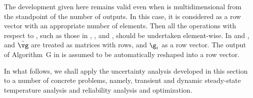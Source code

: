 \begin{remark} 
The development given here remains valid even when \g is multidimensional from
the standpoint of the number of outputs. In this case, it is considered as a row
vector with an appropriate number of elements. Then all the operations with
respect to \g, such as those in ,
, and , should be undertaken
element-wise. In  and , \vg and
$\hat{\vg}$ are treated as matrices with \nc rows, and $\g_i$ as a row vector.
The output of Algorithm~G in  is assumed to be
automatically reshaped into a row vector.
\end{remark}

In what follows, we shall apply the uncertainty analysis developed in this
section to a number of concrete problems, namely, transient and dynamic
steady-state temperature analysis and reliability analysis and optimization.
